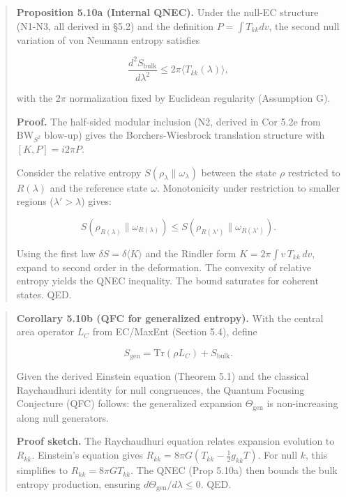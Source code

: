 \documentclass[11pt,a4paper]{article}
\theoremstyle{remark}
\begin{document}
\begin{quote}
\textbf{Proposition 5.10a (Internal QNEC).} Under the null-EC structure (N1-N3,
all derived in §5.2) and the definition \(P = \int T_{kk} dv\), the second
null variation of von Neumann entropy satisfies

\[
\frac{d^2 S_{\mathrm{bulk}}}{d\lambda^2} \le 2\pi \langle T_{kk}(\lambda) \rangle,
\]

with the \(2\pi\) normalization fixed by Euclidean regularity (Assumption G).

\textbf{Proof.} The half-sided modular inclusion (N2, derived in Cor 5.2e from
BW\(_{S^2}\) blow-up) gives the Borchers-Wiesbrock translation structure with
\([K, P] = i 2\pi P\).

Consider the relative entropy \(S(\rho_\lambda \| \omega_\lambda)\) between the
state \(\rho\) restricted to \(R(\lambda)\) and the reference state \(\omega\).
Monotonicity under restriction to smaller regions (\(\lambda' > \lambda\)) gives:

\[
S(\rho_{R(\lambda)} \| \omega_{R(\lambda)}) \le S(\rho_{R(\lambda')} \| \omega_{R(\lambda')}).
\]

Using the first law \(\delta S = \delta \langle K \rangle\) and the Rindler form
\(K = 2\pi \int v \, T_{kk} \, dv\), expand to second order in the deformation.
The convexity of relative entropy yields the QNEC inequality. The bound
saturates for coherent states. QED.
\end{quote}

\begin{quote}
\textbf{Corollary 5.10b (QFC for generalized entropy).} With the central area
operator \(L_C\) from EC/MaxEnt (Section 5.4), define

\[
S_{\mathrm{gen}} = \mathrm{Tr}(\rho L_C) + S_{\mathrm{bulk}}.
\]

Given the derived Einstein equation (Theorem 5.1) and the classical
Raychaudhuri identity for null congruences, the Quantum Focusing Conjecture
(QFC) follows: the generalized expansion \(\Theta_{\mathrm{gen}}\) is
non-increasing along null generators.

\textbf{Proof sketch.} The Raychaudhuri equation relates expansion evolution to
\(R_{kk}\). Einstein's equation gives \(R_{kk} = 8\pi G (T_{kk} - \frac{1}{2}g_{kk}T)\).
For null \(k\), this simplifies to \(R_{kk} = 8\pi G T_{kk}\). The QNEC
(Prop 5.10a) then bounds the bulk entropy production, ensuring
\(d\Theta_{\mathrm{gen}}/d\lambda \le 0\). QED.
\end{quote}
\end{document}
